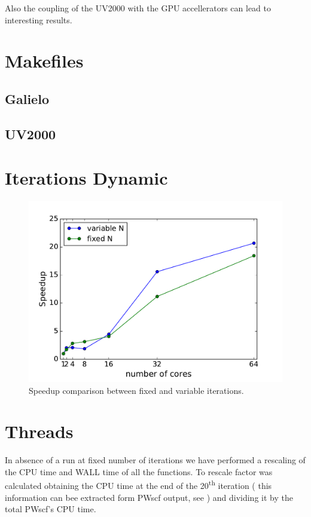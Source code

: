 \documentclass[a4paper,12pt]{article}
\begin{document}
Also the coupling of the UV2000 with the GPU accellerators can lead to interesting results.




\begin{appendices}

\newpage
\section{Makefiles} \label{app:makefiles}
\subsection{Galielo}


\newpage
\subsection{UV2000}



\newpage
\section{Iterations Dynamic} \label{app:IterationDynamic}

\begin{figure}[hhh!]
	\centerline{\includegraphics[width=0.6\linewidth]{fixed_vs_variable_speedup.pdf}}
	\caption{ Speedup comparison between fixed and variable iterations.
	}
	\label{fig:fixedvsvariablespeedup}
\end{figure}

\section{Threads}\label{app:Threads}

In absence of a run at fixed number of iterations we have performed a rescaling of the CPU time and WALL time of all the functions.
To rescale factor was calculated obtaining the CPU time at the end of the 20\textsuperscript{th} iteration ( this information can bee extracted form PWscf output, see \cite{qetools}) and dividing it by the total PWscf's CPU time.


\end{appendices}
\end{document}
